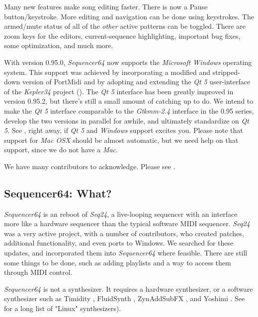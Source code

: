 \documentclass[
 11pt,
 twoside,
 a4paper,
 headinclude,
 footinclude,
 final                                 %
]{article}
\begin{document}
   Many new features make song editing faster.
   There is now a Pause button/keystroke.
   More editing and navigation can be done using keystrokes.
   The armed/mute status of all of the \textsl{other} active patterns can be
   toggled.
   There are zoom keys for the editors, current-sequence highlighting,
   important bug fixes, some optimization, and much more.

   With version 0.95.0, \textsl{Sequencer64} now supports the
   \textsl{Microsoft Windows} operating system.  This support was achieved by
   incorporating a modified and stripped-down version of PortMidi and by
   adopting and extending the \textsl{Qt 5} user-interface of the
   \textsl{Kepler34} project (\cite{kepler34}).
   The \textsl{Qt 5} interface has been greatly improved in version
   0.95.2, but there's still a small amount of catching up to do.
   We intend to make the \textsl{Qt 5} interface comparable to the
   \textsl{Gtkmm-2.4} interface in the 0.95 series, develop the two
   versions in parallel for awhile, and ultimately standardize on
   \textsl{Qt 5}.
   See , right away, if \textsl{Qt 5} and
   \textsl{Windows} support excites you.
   Please note that support for \textsl{Mac OSX} should be almost automatic,
   but we need help on that support, since we do not have a \textsl{Mac}.

   We have many contributors to acknowledge.  Please see
   .

\subsection{Sequencer64: What?}
\label{subsec:what_is_sequencer64}

   \textsl{Sequencer64} is an reboot of \textsl{Seq24},
   a live-looping sequencer with an interface more like a hardware sequencer
   than the typical software MIDI sequencer.
   \textsl{Seq24} was a very active project, with a
   number of contributors, who created patches, additional
   functionality, and even ports to Windows.
   We searched for these updates, and
   incorporated them into \textsl{Sequencer64} where feasible.
   There are still some things to be done, such as adding playlists and a way
   to access them through MIDI control.

   \textsl{Sequencer64} is not a synthesizer.  It requires a hardware
   synthesizer, or a software synthesizer such as Timidity \cite{timidity},
   FluidSynth \cite{fluidsynth}, ZynAddSubFX \cite{zynaddsubfx}, and Yoshimi
   \cite{yoshimi} \cite{yoshimi2}.
   See \cite{linuxsynths} for a long list of "Linux" synthesizers).
\end{document}
